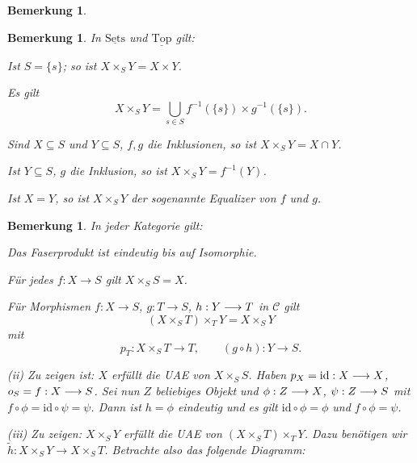\documentclass[11pt]{book}
\newtheorem{remark}[theorem]{Bemerkung}
\theoremstyle{nonumberbreak}
\newenvironment{pr}[1][]{\ifthenelse{\equal{#1}{}}{\proof}{\proof[#1]}\rm}{\endproof}
\newcommand{\topraum}{\underline{\mathrm{Top}}}
\newcommand{\sets}{\underline{\mathrm{Sets}}}
\begin{document}
\begin{spacing}{1.4}
\begin{remark}
\begin{pr}
\end{pr}
\end{remark}



\begin{remark}  %
In $\sets$ und $\topraum$ gilt:
\begin{compactenum}
\item Ist $S = \{s\}$; so ist $X \times_S Y = X \times Y$.
\item Es gilt 
$$X \times_S Y = \bigcup_{s \in S} f^{-1}(\{s\}) \times g^{-1}(\{s\}).$$
\item Sind $X \subseteq S$ und $Y \subseteq S$, $f,g$ die Inklusionen, so ist $X \times_S Y = X \cap Y$.
\item Ist $Y \subseteq S$, $g$ die Inklusion, so ist $X \times_S Y = f^{-1}(Y)$.
\item Ist $X=Y$, so ist $X \times_S Y$ der sogenannte \textit{Equalizer} von $f$ und $g$.
\end{compactenum}

\end{remark}

\begin{remark}
In jeder Kategorie gilt:
\begin{compactenum}
\item Das Faserprodukt ist eindeutig bis auf Isomorphie.
\item Für jedes $f: X \longrightarrow S$ gilt $X \times_S S = X$.
\item Für Morphismen $f: X \longrightarrow S$, $g: T \longrightarrow S$, $h: Y \longrightarrow T$ in $\mathcal{C}$ gilt
$$\left( X \times_S T \right) \times_T Y = X \times_S Y$$
mit $$p_T: X \times_S T \longrightarrow T, \qquad \left( g \circ h \right): Y \longrightarrow S.$$

\end{compactenum}

\begin{pr}
\begin{compactenum}
\item[(ii)] Zu zeigen ist: $X$ erfüllt die UAE von $X \times_S S$. Haben $p_X = \textrm{id}: X \longrightarrow X$, $o_S=f: X \longrightarrow S$. Sei nun $Z$ beliebiges Objekt und $\phi: Z \longrightarrow X$, $\psi: Z \longrightarrow S$ mit $f \circ \phi = \textrm{id} \circ \psi = \psi$. Dann ist $h= \phi$ eindeutig und es gilt $\textrm{id} \circ \phi = \phi$ und $f \circ \phi = \psi$.

\item[(iii)] Zu zeigen: $X \times_S Y$ erfüllt die UAE von $\left( X \times_S T \right) \times_T Y$. Dazu benötigen wir $\tilde{h}: X \times_S Y \longrightarrow X \times_S T$. Betrachte also das folgende Diagramm:


\end{compactenum}
\end{pr}
\end{remark}
\end{spacing}
\end{document}
